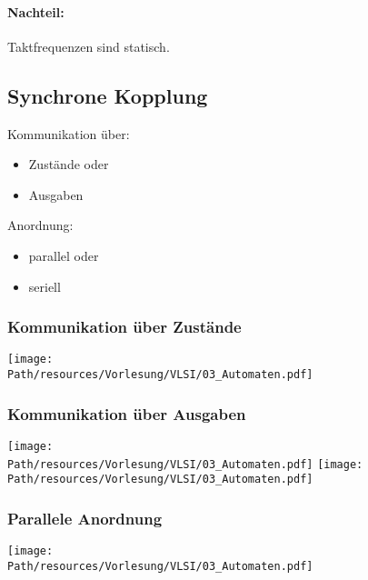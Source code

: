 		\paragraph{Nachteil:} Taktfrequenzen sind statisch.
		
		
\subsection{Synchrone Kopplung}
	Kommunikation über:
	\begin{itemize}
		\item Zustände oder
		\item Ausgaben
	\end{itemize}
	
	Anordnung:
	\begin{itemize}
		\item parallel oder
		\item seriell
	\end{itemize}
	
	
	\subsubsection{Kommunikation über Zustände}
		\begin{center}
			\texttt{[image: \\Path/resources/Vorlesung/VLSI/03\_Automaten.pdf]}
		\end{center}
	
	\subsubsection{Kommunikation über Ausgaben}
		\begin{center}
			\texttt{[image: \\Path/resources/Vorlesung/VLSI/03\_Automaten.pdf]}
			\texttt{[image: \\Path/resources/Vorlesung/VLSI/03\_Automaten.pdf]}
		\end{center}
	
	\subsubsection{Parallele Anordnung}
		\begin{center}
			\texttt{[image: \\Path/resources/Vorlesung/VLSI/03\_Automaten.pdf]}
		\end{center}
		
